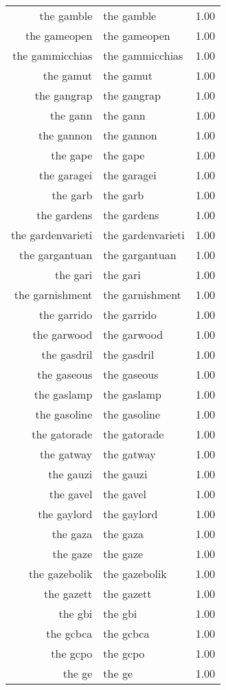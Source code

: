 \begin{table}[ht]
\begin{tabular}{rlr}
  the gamble & the gamble & 1.00 \\ 
  the gameopen & the gameopen & 1.00 \\ 
  the gammicchias & the gammicchias & 1.00 \\ 
  the gamut & the gamut & 1.00 \\ 
  the gangrap & the gangrap & 1.00 \\ 
  the gann & the gann & 1.00 \\ 
  the gannon & the gannon & 1.00 \\ 
  the gape & the gape & 1.00 \\ 
  the garagei & the garagei & 1.00 \\ 
  the garb & the garb & 1.00 \\ 
  the gardens & the gardens & 1.00 \\ 
  the gardenvarieti & the gardenvarieti & 1.00 \\ 
  the gargantuan & the gargantuan & 1.00 \\ 
  the gari & the gari & 1.00 \\ 
  the garnishment & the garnishment & 1.00 \\ 
  the garrido & the garrido & 1.00 \\ 
  the garwood & the garwood & 1.00 \\ 
  the gasdril & the gasdril & 1.00 \\ 
  the gaseous & the gaseous & 1.00 \\ 
  the gaslamp & the gaslamp & 1.00 \\ 
  the gasoline & the gasoline & 1.00 \\ 
  the gatorade & the gatorade & 1.00 \\ 
  the gatway & the gatway & 1.00 \\ 
  the gauzi & the gauzi & 1.00 \\ 
  the gavel & the gavel & 1.00 \\ 
  the gaylord & the gaylord & 1.00 \\ 
  the gaza & the gaza & 1.00 \\ 
  the gaze & the gaze & 1.00 \\ 
  the gazebolik & the gazebolik & 1.00 \\ 
  the gazett & the gazett & 1.00 \\ 
  the gbi & the gbi & 1.00 \\ 
  the gcbca & the gcbca & 1.00 \\ 
  the gcpo & the gcpo & 1.00 \\ 
  the ge & the ge & 1.00 \\ 

\end{tabular}
\end{table}
